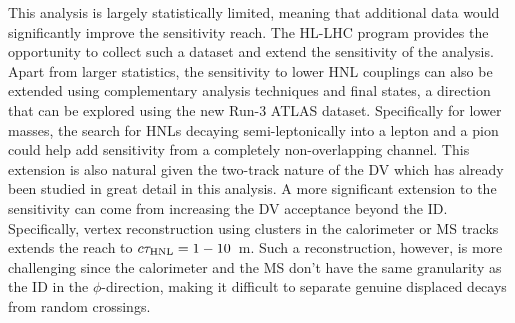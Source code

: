 This analysis is largely statistically limited, meaning that additional data would significantly improve the sensitivity reach. The HL-LHC program provides the opportunity to collect such a dataset and extend the sensitivity of the analysis. Apart from larger statistics, the sensitivity to lower HNL couplings can also be extended using complementary analysis techniques and final states, a direction that can be explored using the new Run-3 ATLAS dataset. Specifically for lower masses, the search for HNLs decaying semi-leptonically into a lepton and a pion could help add sensitivity from a completely non-overlapping channel. This extension is also natural given the two-track nature of the DV which has already been studied in great detail in this analysis. A more significant extension to the sensitivity can come from increasing the DV acceptance beyond the ID. Specifically, vertex reconstruction using clusters in the calorimeter or MS tracks extends the reach to $c\tau_\mathrm{HNL}=1-10$~m. Such a reconstruction, however, is more challenging since the calorimeter and the MS don't have the same granularity as the ID in the $\phi$-direction, making it difficult to separate genuine displaced decays from random crossings.